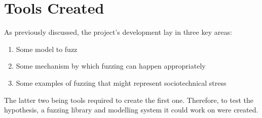 \chapter{Tools Created}
\label{implementation_head}
As previously discussed, the project's development lay in three key areas: 
\begin{enumerate}
    \item Some model to fuzz
    \item Some mechanism by which fuzzing can happen appropriately
    \item Some examples of fuzzing that might represent sociotechnical stress
\end{enumerate}\par

The latter two being tools required to create the first one. Therefore, to test the hypothesis, a fuzzing library and modelling system it could work on were created. 

